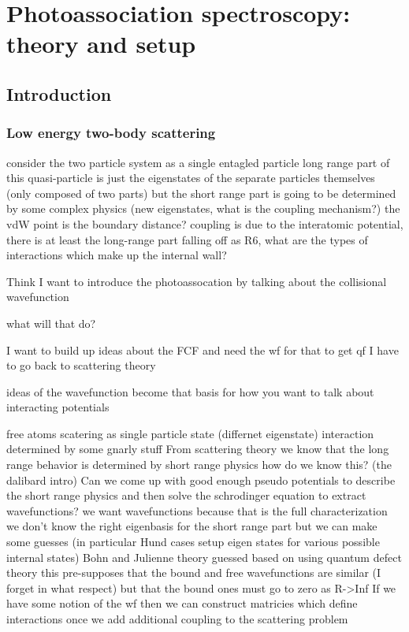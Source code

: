 \chapter{Photoassociation spectroscopy: theory and setup}
\label{ch:chap3}

\section{Introduction}
\label{sec:pas_intro}

\subsection{Low energy two-body scattering}
\label{ssec:scattering}

consider the two particle system as a single entagled particle
	long range part of this quasi-particle is just the eigenstates of the separate particles themselves (only composed of two parts)
	but the short range part is going to be determined by some complex physics (new eigenstates, what is the coupling mechanism?)
		the vdW point is the boundary distance?
		coupling is due to the interatomic potential, there is at least the long-range part falling off as R6, what are the types of interactions which make up the internal wall?


Think I want to introduce the photoassocation by talking about the collisional wavefunction

what will that do?

I want to build up ideas about the FCF and need the wf for that
	to get qf I have to go back to scattering theory

ideas of the wavefunction become that basis for how you want to talk about interacting potentials


free atoms
scatering as single particle state (differnet eigenstate)
	interaction determined by some gnarly stuff
From scattering theory we know that the long range behavior is determined by short range physics
	how do we know this? (the dalibard intro)
Can we come up with good enough pseudo potentials to describe the short range physics and then solve the schrodinger equation to extract wavefunctions?
	we want wavefunctions because that is the full characterization
	we don't know the right eigenbasis for the short range part but we can make some guesses (in particular Hund cases setup eigen states for various possible internal states)
	Bohn and Julienne theory guessed based on using quantum defect theory
		this pre-supposes that the bound and free wavefunctions are similar (I forget in what respect) but that the bound ones must go to zero as R->Inf
If we have some notion of the wf then we can construct matricies which define interactions once we add additional coupling to the scattering problem


